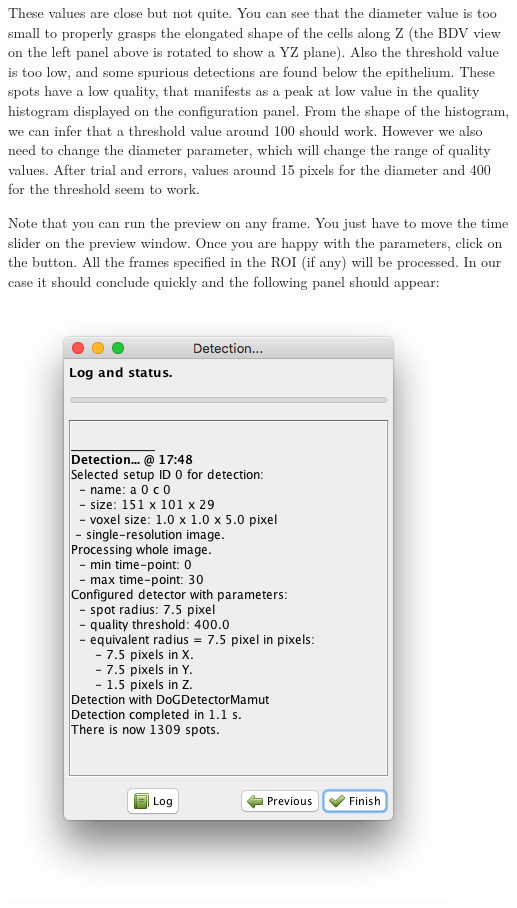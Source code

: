 These values are close but not quite.
You can see that the diameter value is too small to properly grasps the elongated shape of the cells along Z (the BDV view on the left panel above is rotated to show a YZ plane). 
Also the threshold value is too low, and some spurious detections are found below the epithelium.
These spots have a low quality, that manifests as a peak at low value in the quality histogram displayed on the configuration panel.
From the shape of the histogram, we can infer that a threshold value around 100 should work.
However we also need to change the diameter parameter, which will change the range of quality values.
After trial and errors, values around 15 pixels for the diameter and 400 for the threshold seem to work.

Note that you can run the preview on any frame.
You just have to move the time slider on the preview window.
Once you are happy with the parameters, click on the  button.
All the frames specified in the ROI (if any) will be processed. 
In our case it should conclude quickly and the following panel should appear:

\begin{center}
         \includegraphics[height=0.25\textheight]{figures/Mastodon_DetectionResuts.png}
\end{center}

